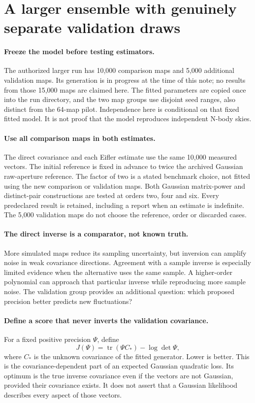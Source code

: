 \documentclass[11pt]{article}
\begin{document}
\section{A larger ensemble with genuinely separate validation draws}
\paragraph{Freeze the model before testing estimators.}
The authorized larger run has 10,000 comparison maps and 5,000 additional
validation maps. Its generation is in progress at the time of this note;
no results from those 15,000 maps are claimed here. The fitted parameters
are copied once into the run directory, and the two map groups use disjoint
seed ranges, also distinct from the 64-map pilot. Independence here is
conditional on that fixed fitted model. It is not proof that the model
reproduces independent N-body skies.

\paragraph{Use all comparison maps in both estimates.}
The direct covariance and each Eifler estimate use the same 10,000 measured
vectors. The initial reference is fixed in advance to twice the archived
Gaussian raw-aperture reference. The factor of two is a stated benchmark
choice, not fitted using the new comparison or validation maps. Both Gaussian
matrix-power and distinct-pair constructions are tested at orders two,
four and six. Every predeclared result is retained, including a report when
an estimate is indefinite. The 5,000 validation maps do not choose the
reference, order or discarded cases.

\paragraph{The direct inverse is a comparator, not known truth.}
More simulated maps reduce its sampling uncertainty, but inversion can
amplify noise in weak covariance directions. Agreement with a sample inverse
is especially limited evidence when the alternative uses the same sample.
A higher-order polynomial can approach that particular inverse while
reproducing more sample noise. The validation group provides an additional
question: which proposed precision better predicts new fluctuations?

\paragraph{Define a score that never inverts the validation covariance.}
For a fixed positive precision $\Psi$, define
\begin{equation}
 J(\Psi)=\operatorname{tr}(\Psi C_*)-\log\det\Psi,
\end{equation}
where $C_*$ is the unknown covariance of the fitted generator. Lower is
better. This is the covariance-dependent part of an expected Gaussian
quadratic loss. Its optimum is the true inverse covariance even if the
vectors are not Gaussian, provided their covariance exists. It does not
assert that a Gaussian likelihood describes every aspect of those vectors.
\end{document}
